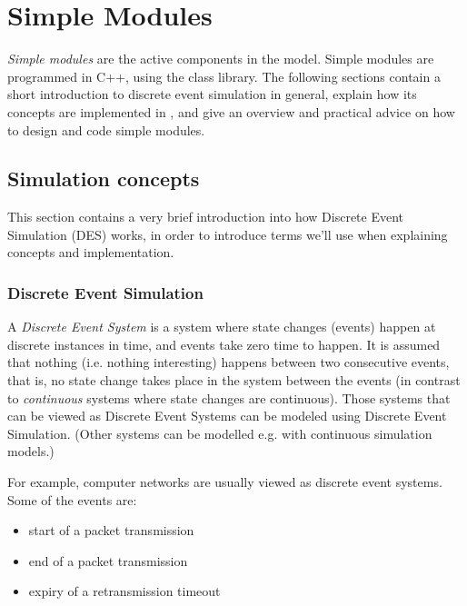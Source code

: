 \chapter{Simple Modules}
\label{cha:simple-modules}


\textit{Simple modules} are the active components in the model.
Simple modules are programmed in C++, using the {\opp} class
library. The following sections contain a short introduction
to discrete event simulation in general, explain how its concepts are
implemented in {\opp}, and give an overview and practical advice
on how to design and code simple modules.



\section{Simulation concepts}

This section contains a very brief introduction into how Discrete
Event Simulation (DES) works, in order to introduce terms we'll use
when explaining {\opp} concepts and
implementation.


\subsection{Discrete Event Simulation}

A \textit{Discrete Event System} is a system where state changes
(events) happen at discrete instances in time, and events take zero time
to happen. It is assumed that nothing (i.e. nothing interesting)
happens between two consecutive events, that is, no state change takes
place in the system between the events (in contrast to
\textit{continuous} systems where state changes are continuous). Those
systems that can be viewed as Discrete Event Systems can be modeled
using Discrete Event Simulation.
(Other systems can be modelled e.g. with continuous simulation models.)

For example, computer networks are usually viewed as discrete
event systems. Some of the events are:

\begin{itemize}
  \item{start of a packet transmission}
  \item{end of a packet transmission}
  \item{expiry of a retransmission timeout}
\end{itemize}


